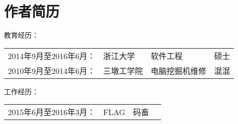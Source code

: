 \chapter{作者简历}
\noindent 教育经历：

\begin{tabular}{llll}
    2014年9月至2016年6月： &  浙江大学  & 软件工程  &  硕士    \\
    2010年9月至2014年6月： &  三墩工学院  & 电脑挖掘机维修  &  混混
\end{tabular}

\noindent 工作经历：

\begin{tabular}{llll}
    2015年6月至2016年3月： &  FLAG   &  码畜
\end{tabular}



